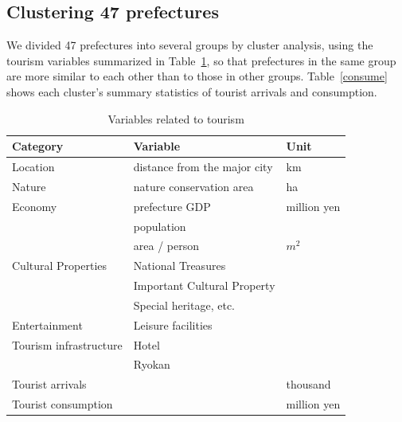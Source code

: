 \documentclass[10pt, conference, compsocconf]{IEEEtran}
\begin{document}
\subsection{Clustering 47 prefectures}\label{clus}


We divided 47 prefectures into several groups by cluster analysis, using the tourism variables summarized in Table~\ref{data}, so that prefectures in the same group are more similar to each other than to those in other groups.
Table~\ref{consume} shows each cluster's summary statistics of tourist arrivals and consumption. 



\begin{table}[!h]\caption{Variables related to tourism}\label{data}
\centering
\begin{tabular}{l|l|l}
\hline
\bf Category & \bf Variable & \bf Unit \\\hline
Location & distance from the major city& km \\\hline
Nature & nature conservation area &ha\\\hline
Economy & prefecture GDP & million yen\\
 & population & \\
 & area / person& $m^2$\\\hline
Cultural Properties & National Treasures &  \\
 & Important Cultural Property  &  \\
 & Special heritage, etc.  \\\hline
Entertainment & Leisure facilities \\\hline
Tourism infrastructure & Hotel \\
 & Ryokan  \\\hline
Tourist arrivals & & thousand\\
Tourist consumption &  & million yen \\\hline %
\end{tabular}
\end{table}
\end{document}
